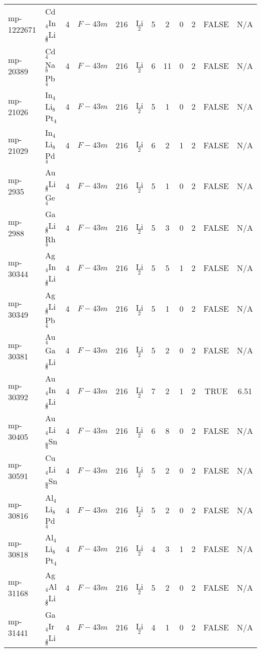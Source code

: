 {\begin{longtable}{llcccccccccc}
    mp-1222671 & Cd$_{4}$In$_{4}$Li$_{8}$ & 4     & $F-43m$ & 216   & Li$_{2}$ & 5     & 2     & 0     & 2     & FALSE & N/A \\
    mp-20389 & Cd$_{4}$Na$_{8}$Pb$_{4}$ & 4     & $F-43m$ & 216   & Li$_{2}$ & 6     & 11    & 0     & 2     & FALSE & N/A \\
    mp-21026 & In$_{4}$Li$_{8}$Pt$_{4}$ & 4     & $F-43m$ & 216   & Li$_{2}$ & 5     & 1     & 0     & 2     & FALSE & N/A \\
    mp-21029 & In$_{4}$Li$_{8}$Pd$_{4}$ & 4     & $F-43m$ & 216   & Li$_{2}$ & 6     & 2     & 1     & 2     & FALSE & N/A \\
    mp-2935 & Au$_{4}$Li$_{8}$Ge$_{4}$ & 4     & $F-43m$ & 216   & Li$_{2}$ & 5     & 1     & 0     & 2     & FALSE & N/A \\
    mp-2988 & Ga$_{4}$Li$_{8}$Rh$_{4}$ & 4     & $F-43m$ & 216   & Li$_{2}$ & 5     & 3     & 0     & 2     & FALSE & N/A \\
    mp-30344 & Ag$_{4}$In$_{4}$Li$_{8}$ & 4     & $F-43m$ & 216   & Li$_{2}$ & 5     & 5     & 1     & 2     & FALSE & N/A \\
    mp-30349 & Ag$_{4}$Li$_{8}$Pb$_{4}$ & 4     & $F-43m$ & 216   & Li$_{2}$ & 5     & 1     & 0     & 2     & FALSE & N/A \\
    mp-30381 & Au$_{4}$Ga$_{4}$Li$_{8}$ & 4     & $F-43m$ & 216   & Li$_{2}$ & 5     & 2     & 0     & 2     & FALSE & N/A \\
    mp-30392 & Au$_{4}$In$_{4}$Li$_{8}$ & 4     & $F-43m$ & 216   & Li$_{2}$ & 7     & 2     & 1     & 2     & TRUE  & 6.51  \\
    mp-30405 & Au$_{4}$Li$_{8}$Sn$_{4}$ & 4     & $F-43m$ & 216   & Li$_{2}$ & 6     & 8     & 0     & 2     & FALSE & N/A \\
    mp-30591 & Cu$_{4}$Li$_{8}$Sn$_{4}$ & 4     & $F-43m$ & 216   & Li$_{2}$ & 5     & 2     & 0     & 2     & FALSE & N/A \\
    mp-30816 & Al$_{4}$Li$_{8}$Pd$_{4}$ & 4     & $F-43m$ & 216   & Li$_{2}$ & 5     & 2     & 0     & 2     & FALSE & N/A \\
    mp-30818 & Al$_{4}$Li$_{8}$Pt$_{4}$ & 4     & $F-43m$ & 216   & Li$_{2}$ & 4     & 3     & 1     & 2     & FALSE & N/A \\
    mp-31168 & Ag$_{4}$Al$_{4}$Li$_{8}$ & 4     & $F-43m$ & 216   & Li$_{2}$ & 5     & 2     & 0     & 2     & FALSE & N/A \\
    mp-31441 & Ga$_{4}$Ir$_{4}$Li$_{8}$ & 4     & $F-43m$ & 216   & Li$_{2}$ & 4     & 1     & 0     & 2     & FALSE & N/A \\

\end{longtable}}
